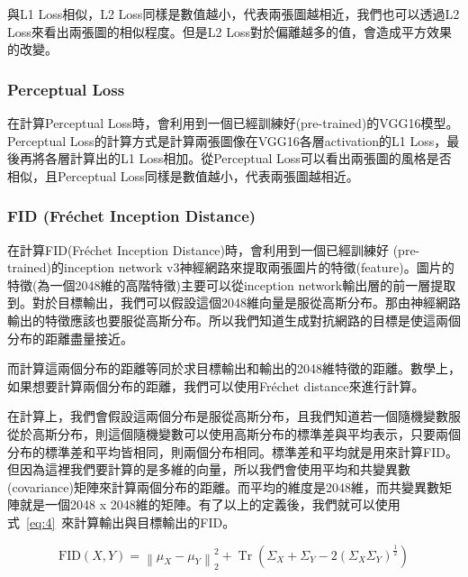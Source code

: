\documentclass[a4paper, 12pt]{article}
\begin{document}
與L1 Loss相似，L2 Loss同樣是數值越小，代表兩張圖越相近，我們也可以透過L2 Loss來看出兩張圖的相似程度。但是L2 Loss對於偏離越多的值，會造成平方效果的改變。

\subsubsection{Perceptual Loss}

在計算Perceptual Loss\cite{zhang2018perceptual}時，會利用到一個已經訓練好(pre-trained)的VGG16模型。Perceptual Loss的計算方式是計算兩張圖像在VGG16各層activation的L1 Loss，最後再將各層計算出的L1 Loss相加。從Perceptual Loss可以看出兩張圖的風格是否相似，且Perceptual Loss同樣是數值越小，代表兩張圖越相近。

\subsubsection{FID (Fréchet Inception Distance)}
在計算FID(Fréchet Inception Distance)\cite{DOWSON1982450}時，會利用到一個已經訓練好 (pre-trained)的inception network v3神經網路來提取兩張圖片的特徵(feature)。圖片的特徵(為一個2048維的高階特徵)主要可以從inception network輸出層的前一層提取到。對於目標輸出，我們可以假設這個2048維向量是服從高斯分布。那由神經網路輸出的特徵應該也要服從高斯分布。所以我們知道生成對抗網路的目標是使這兩個分布的距離盡量接近。

而計算這兩個分布的距離等同於求目標輸出和輸出的2048維特徵的距離。數學上，如果想要計算兩個分布的距離，我們可以使用Fréchet distance來進行計算。

在計算上，我們會假設這兩個分布是服從高斯分布，且我們知道若一個隨機變數服從於高斯分布，則這個隨機變數可以使用高斯分布的標準差與平均表示，只要兩個分布的標準差和平均皆相同，則兩個分布相同。標準差和平均就是用來計算FID。但因為這裡我們要計算的是多維的向量，所以我們會使用平均和共變異數(covariance)矩陣來計算兩個分布的距離。而平均的維度是2048維，而共變異數矩陣就是一個2048 x 2048維的矩陣。有了以上的定義後，我們就可以使用式~\ref{eq:4}~來計算輸出與目標輸出的FID。


\begin{equation}
    \mathrm{FID}(X, Y)=\left\|\mu_{X}-\mu_{Y}\right\|_{2}^{2}+\operatorname{Tr}\left(\Sigma_{X}+\Sigma_{Y}-2\left(\Sigma_{X} \Sigma_{Y}\right)^{\frac{1}{2}}\right)
    \label{eq:4}
\end{equation}
\end{document}
